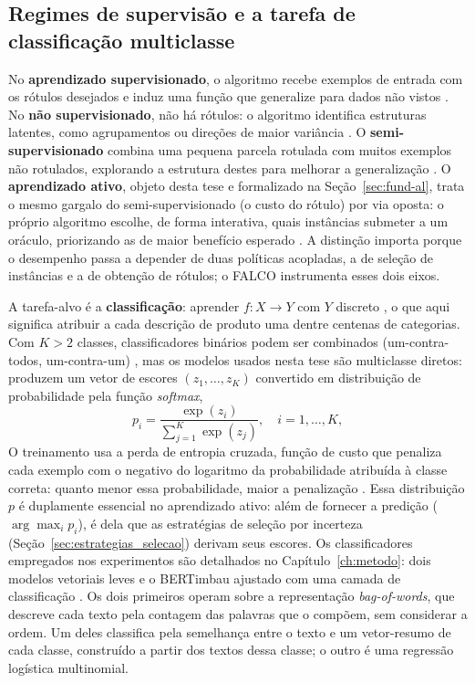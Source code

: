 \subsection{Regimes de supervisão e a tarefa de classificação multiclasse}
\label{subsec:ml_types}

No \textbf{aprendizado supervisionado}, o algoritmo recebe exemplos de entrada
com os rótulos desejados e induz uma função que generalize para dados não
vistos \cite{Russell2010, Mitchell1997}. No \textbf{não supervisionado}, não
há rótulos: o algoritmo identifica estruturas latentes, como agrupamentos ou
direções de maior variância \cite{Murphy2012}. O \textbf{semi-supervisionado}
combina uma pequena parcela rotulada com muitos exemplos não rotulados,
explorando a estrutura destes para melhorar a generalização
\cite{Chapelle2006}. O \textbf{aprendizado ativo}, objeto desta tese e
formalizado na Seção~\ref{sec:fund-al}, trata o mesmo gargalo do
semi-supervisionado (o custo do rótulo) por via oposta: o próprio algoritmo
escolhe, de forma interativa, quais instâncias submeter a um oráculo,
priorizando as de maior benefício esperado \cite{Settles2009}. A distinção
importa porque o desempenho passa a depender de duas políticas acopladas, a
de seleção de instâncias e a de obtenção de rótulos; o FALCO instrumenta
esses dois eixos.

A tarefa-alvo é a \textbf{classificação}: aprender $f: X \to Y$ com $Y$
discreto \cite{Duda2001}, o que aqui significa atribuir a cada descrição de
produto uma dentre centenas de categorias. Com $K>2$ classes, classificadores binários
podem ser combinados (um-contra-todos, um-contra-um) \cite{Rifkin2004}, mas os
modelos usados nesta tese são multiclasse diretos: produzem um vetor de
escores $(z_1,\dots,z_K)$ convertido em distribuição de probabilidade pela
função \textit{softmax},
\begin{equation}
p_i = \frac{\exp(z_i)}{\sum_{j=1}^{K} \exp(z_j)}, \quad i = 1, \dots, K,
\label{eq:softmax_ml}
\end{equation}
O treinamento usa a perda de entropia cruzada, função de custo que penaliza
cada exemplo com o negativo do logaritmo da probabilidade atribuída à classe
correta: quanto menor essa probabilidade, maior a penalização
\cite{Bishop2006, Murphy2012}. Essa
distribuição $p$ é duplamente essencial no aprendizado ativo: além de fornecer
a predição ($\arg\max_i p_i$), é dela que as estratégias de seleção por
incerteza (Seção~\ref{sec:estrategias_selecao}) derivam seus escores. Os
classificadores empregados nos experimentos são detalhados no
Capítulo~\ref{ch:metodo}: dois modelos vetoriais leves e o BERTimbau ajustado
com uma camada de classificação \cite{Souza2020BERTimbau}. Os dois primeiros
operam sobre a representação \textit{bag-of-words}, que descreve cada texto
pela contagem das palavras que o compõem, sem considerar a ordem. Um deles
classifica pela semelhança entre o texto e um vetor-resumo de cada classe,
construído a partir dos textos dessa classe; o outro é uma regressão
logística multinomial.

